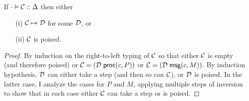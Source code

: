 \begin{theorem}
\label{thm:progress}
\mbox{}
If $\cdot \vDash \mathcal{C} :: \Delta$ then either
\begin{enumerate}
\item[(i)] $\mathcal{C} \mapsto \mathcal{D}$ for some $\mathcal{D}$, or
\item[(ii)] $\mathcal{C}$ is poised.
\end{enumerate}
\end{theorem}
\begin{proof}
By induction on the right-to-left typing of $\mathcal{C}$ so that either
$\mathcal{C}$ is empty (and therefore poised) or
$\mathcal{C} = (\mathcal{D}\; \mathsf{proc}(c, P))$ or
$\mathcal{C} = (\mathcal{D}\; \mathsf{msg}(c, M))$. By induction hypothesis, $\mathcal{D}$ can
either take a step (and then so can $\mathcal{C}$), or $\mathcal{D}$ is poised.  In
the latter case, I
analyze the cases for $P$ and $M$, applying multiple steps of
inversion to show that in each
case either $\mathcal{C}$ can take a step or is poised.
\end{proof}


